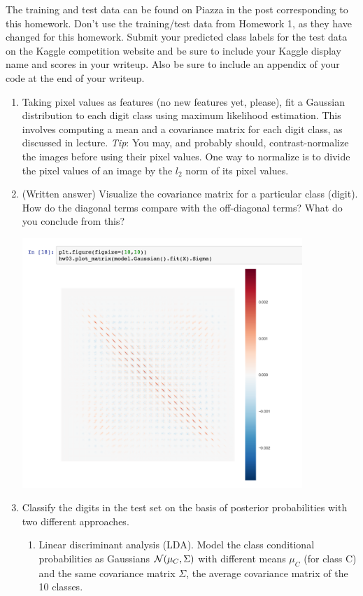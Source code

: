 \noindent
The training and test data can be found on Piazza in the post corresponding to this homework. Don’t use the training/test data from Homework 1, as they have changed for this homework. Submit your predicted class labels for the test data on the Kaggle competition website and be sure to include your Kaggle display name and scores in your writeup. Also be sure to include an appendix of your code at the end of your writeup.

\begin{enumerate}[label=(\alph*)]
\item Taking pixel values as features (no new features yet, please), fit a
  Gaussian distribution to each digit class using maximum likelihood
  estimation. This involves computing a mean and a covariance matrix for each
  digit class, as discussed in lecture. \emph{Tip}: You may, and probably
  should, contrast-normalize the images before using their pixel values. One
  way to normalize is to divide the pixel values of an image by the $l_2$ norm
  of its pixel values.
\item (Written answer) Visualize the covariance matrix for a particular class
  (digit). How do the diagonal terms compare with the off-diagonal terms? What
  do you conclude from this?
    \begin{mdframed}
      \includegraphics[width=300pt]{img/hw03_6b.png}
    \end{mdframed}

  \item Classify the digits in the test set on the basis of posterior
    probabilities with two different approaches.
    \begin{enumerate}[label=(\roman*)]
        \item Linear discriminant analysis (LDA). Model the class conditional probabilities as Gaussians $\mathcal{N}(\mu_C, \Sigma)$ with different means $\mu_C$ (for class C) and the same covariance matrix $\Sigma$, the average covariance matrix of the 10 classes. \\


\end{enumerate}
\end{enumerate}
